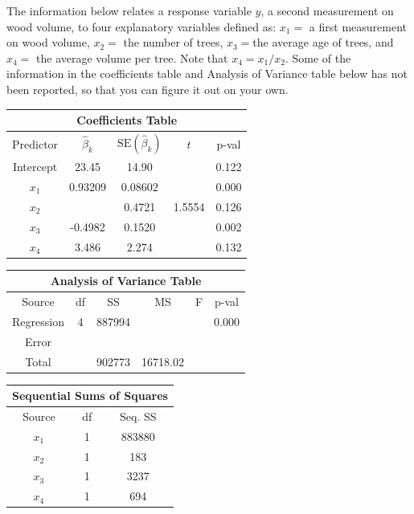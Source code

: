 \documentclass{homework}
\begin{document}
\begin{longproblem}
The information below relates a response variable $y$, a second measurement on
wood volume, to four explanatory variables defined as: $x_1 = $ a first
measurement on wood volume, $x_2 = $ the number of trees, $x_3 = $the average
age of trees, and $x_4 = $ the average volume per tree.  Note that $x_4 =
x_1/x_2$.  Some of the information in the coefficients table and Analysis of
Variance table below has not been reported, so that you can figure it out on
your own.

{\small
\begin{minipage}{.45\textwidth}
\begin{tabular}{c c c c c}
\multicolumn{5}{c}{\bf Coefficients Table} \\ \hline
Predictor & $\hat \beta_k$ & $\mathrm{SE}(\hat \beta_k)$ & $t$ & p-val \\ \hline
Intercept & 23.45   & 14.90   &        & 0.122 \\
$x_1$     & 0.93209 & 0.08602 &        & 0.000 \\ 
$x_2$     &         & 0.4721  & 1.5554 & 0.126 \\
$x_3$     &-0.4982  & 0.1520  &        & 0.002 \\
$x_4$     &3.486    &2.274    &        & 0.132 \\ \hline
\end{tabular}
\end{minipage}
\begin{minipage}{.45\textwidth} 
\begin{center}
\begin{tabular}{c c c c c c}
\multicolumn{6}{c}{\bf Analysis of Variance Table}\\
\hline
Source & df & SS & MS & F & p-val\\ \hline
Regression & 4 & 887994 &  &  & 0.000 \\
Error & & & & & \\
Total & & 902773 & 16718.02 & & \\ \hline
\end{tabular}
\begin{tabular}{c c c}
\multicolumn{3}{c}{\bf Sequential Sums of Squares}\\ \hline
Source & df & Seq. SS \\ \hline
$x_1$& 1 & 883880 \\
$x_2$& 1 & 183 \\
$x_3$& 1 & 3237 \\
$x_4$& 1 & 694\\\hline
\end{tabular}
\end{center}
\end{minipage}
}


\end{longproblem}
\end{document}
